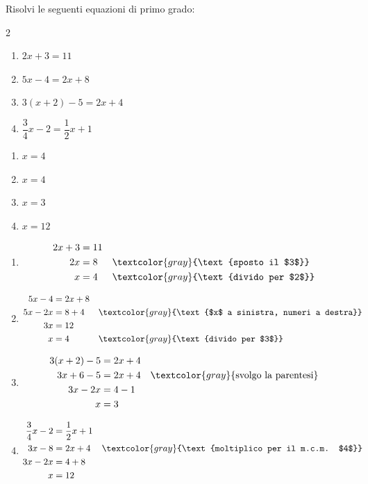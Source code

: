 \begin{question}[ID=2.2, subtitle={Equazioni di primo grado}, difficulty=facile, tags={equazioni lineari}]
Risolvi le seguenti equazioni di primo grado:
\begin{multicols}{2}
\begin{enumerate}[leftmargin=3cm]
    \item $2x + 3 = 11$
    \item $5x - 4 = 2x + 8$
    \item $3(x + 2) - 5 = 2x + 4$
    \item $\dfrac{3}{4}x - 2 = \dfrac{1}{2}x + 1$
\end{enumerate}
\end{multicols}
\begin{solution}
\begin{enumerate}
    \item $x=4$
    \item $x=4$
    \item $x=3$
    \item $x=12$
\end{enumerate}
\end{solution}
\begin{explanation}
\begin{enumerate}
    \item \[\begin{aligned}
    2x+3 &= 11\\
    2x &= 8 && \textcolor{gray}{\text{sposto il $3$}}\\
    x &= 4 && \textcolor{gray}{\text{divido per $2$}}
    \end{aligned}\]
    \item \[\begin{aligned}
    5x-4 &= 2x+8\\
    5x-2x &= 8+4 && \textcolor{gray}{\text{$x$ a sinistra, numeri a destra}}\\
    3x &= 12\\
    x &= 4 && \textcolor{gray}{\text{divido per $3$}}
    \end{aligned}\]
    \item \[\begin{aligned}
    3(x+2)-5 &= 2x+4\\
    3x+6-5 &= 2x+4 && \textcolor{gray}{\text{svolgo la parentesi}}\\
    3x-2x &= 4-1\\
    x &= 3
    \end{aligned}\]
    \item \[\begin{aligned}
    \dfrac34x-2 &= \dfrac12x+1\\
    3x-8 &= 2x+4 && \textcolor{gray}{\text{moltiplico per il m.c.m. $4$}}\\
    3x-2x &= 4+8\\
    x &= 12
    \end{aligned}\]
\end{enumerate}
\end{explanation}
\end{question}

